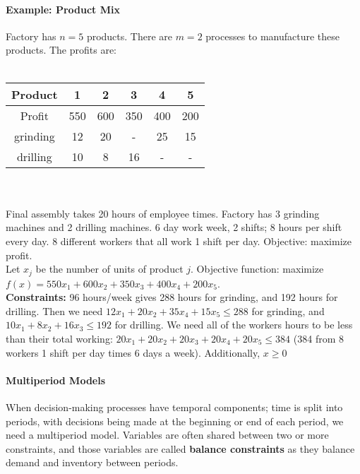 \documentclass[10pt,letter]{article}
\theoremstyle{plain}
\theoremstyle{definition}
\begin{document}
\paragraph{Example: Product Mix}
Factory has $n=5$ products. There are $m=2$ processes to manufacture these products. The profits are:\\ \\ \begin{tabular}{|c|ccccc|}
\hline
Product & 1&2&3&4&5 \\ \hline
Profit & 550&600&350&400&200    \\
grinding & 12&20&-&25&15   \\      
drilling & 10&8&16&-&-\\\hline
\end{tabular}\\ \\
Final assembly takes 20 hours of employee times. Factory has 3 grinding machines and 2 drilling machines. 6 day work week, 2 shifts; 8 hours per shift every day. 8 different workers that all work 1 shift per day. Objective: maximize profit. \\ 
Let $x_j$ be the number of units of product $j$. Objective function: maximize $f(x)=550x_1+600x_2+350x_3+400x_4+200x_5$. \\ 
\textbf{Constraints:} 96 hours/week gives 288 hours for grinding, and 192 hours for drilling. Then we need $12x_1+20x_2+35x_4+15x_5\leq288$ for grinding, and $10x_1+8x_2+16x_3\leq192$ for drilling. We need all of the workers hours to be less than their total working: $20x_1+20x_2+20x_3+20x_4+20x_5\leq384$ (384 from $8$ workers 1 shift per day times 6 days a week). Additionally, $x\geq0$

\paragraph{Multiperiod Models}
When decision-making processes have temporal components; time is split into periods, with decisions being made at the beginning or end of each period, we need a multiperiod model. Variables are often shared between two or more constraints, and those variables are called \textbf{balance constraints} as they balance demand and inventory between periods. 
\end{document}
